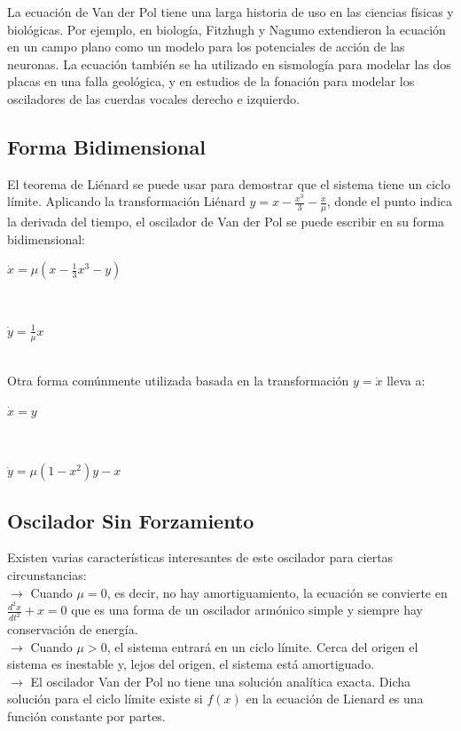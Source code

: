 \documentclass[12pt]{article}
\begin{document}
La ecuación de Van der Pol tiene una larga historia de uso en las ciencias físicas y biológicas. Por ejemplo, en biología, Fitzhugh y Nagumo extendieron la ecuación en un campo plano como un modelo para los potenciales de acción de las neuronas. La ecuación también se ha utilizado en sismología para modelar las dos placas en una falla geológica, y en estudios de la fonación para modelar los osciladores de las cuerdas vocales derecho e izquierdo.

\subsection*{Forma Bidimensional}
El teorema de Liénard se puede usar para demostrar que el sistema tiene un ciclo límite. Aplicando la transformación Liénard $\displaystyle y = x - \frac{x^3}{3}- \frac{\dot x}{\mu}$, donde el punto indica la derivada del tiempo, el oscilador de Van der Pol se puede escribir en su forma bidimensional: \\

\centerline{$\displaystyle \dot x = \mu (x- \frac{1}{3}x^3 - y) $}
$ $\\
\centerline{$\displaystyle \dot y= \frac{1}{\mu}x$}\\

Otra forma comúnmente utilizada basada en la transformación $y = \dot x$ lleva a:\\
\centerline{$\dot x = y$}\\
\centerline{$\dot y = \mu (1-x^2)y-x$}

\subsection*{Oscilador Sin Forzamiento}
Existen varias características interesantes de este oscilador para ciertas circunstancias:\\

$\to$ Cuando $\mu=0$, es decir, no hay amortiguamiento, la ecuación se convierte en $\displaystyle \frac{d^2x}{dt^2}+x = 0$ que es una forma de un oscilador armónico simple y siempre hay conservación de energía.\\

$\to$ Cuando $\mu>0$, el sistema entrará en un ciclo límite. Cerca del origen el sistema es inestable y, lejos del origen, el sistema está amortiguado.\\

$\to$ El oscilador Van der Pol no tiene una solución analítica exacta. Dicha solución para el ciclo límite existe si $f(x)$ en la ecuación de Lienard es una función constante por partes.
\end{document}

